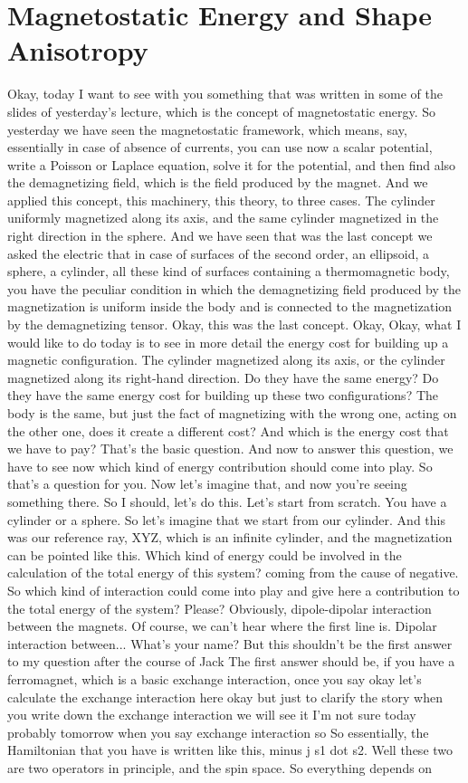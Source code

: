 \chapter{Magnetostatic Energy and Shape Anisotropy}
Okay, today I want to see with you something that was written in some of the slides of yesterday's lecture, which is the concept of magnetostatic energy. So yesterday we have seen the magnetostatic framework, which means, say, essentially in case of absence of currents, you can use now a scalar potential, write a Poisson or Laplace equation, solve it for the potential, and then find also the demagnetizing field, which is the field produced by the magnet. And we applied this concept, this machinery, this theory, to three cases. The cylinder uniformly magnetized along its axis, and the same cylinder magnetized in the right direction in the sphere. And we have seen that was the last concept we asked the electric that in case of surfaces of the second order, an ellipsoid, a sphere, a cylinder, all these kind of surfaces containing a thermomagnetic body, you have the peculiar condition in which the demagnetizing field produced by the magnetization is uniform inside the body and is connected to the magnetization by the demagnetizing tensor. Okay, this was the last concept. Okay, Okay, what I would like to do today is to see in more detail the energy cost for building up a magnetic configuration. The cylinder magnetized along its axis, or the cylinder magnetized along its right-hand direction. Do they have the same energy? Do they have the same energy cost for building up these two configurations? The body is the same, but just the fact of magnetizing with the wrong one, acting on the other one, does it create a different cost? And which is the energy cost that we have to pay? That's the basic question. And now to answer this question, we have to see now which kind of energy contribution should come into play. So that's a question for you. Now let's imagine that, and now you're seeing something there. So I should, let's do this. Let's start from scratch. You have a cylinder or a sphere. So let's imagine that we start from our cylinder. And this was our reference ray, XYZ, which is an infinite cylinder, and the magnetization can be pointed like this. Which kind of energy could be involved in the calculation of the total energy of this system? coming from the cause of negative. So which kind of interaction could come into play and give here a contribution to the total energy of the system? Please? Obviously, dipole-dipolar interaction between the magnets. Of course, we can't hear where the first line is. Dipolar interaction between... What's your name? But this shouldn't be the first answer to my question after the course of Jack The first answer should be, if you have a ferromagnet, which is a basic exchange interaction, once you say okay let's calculate the exchange interaction here okay but just to clarify the story when you write down the exchange interaction we will see it I'm not sure today probably tomorrow when you say exchange interaction so So essentially, the Hamiltonian that you have is written like this, minus j s1 dot s2. Well these two are two operators in principle, and the spin space. So everything depends on 
